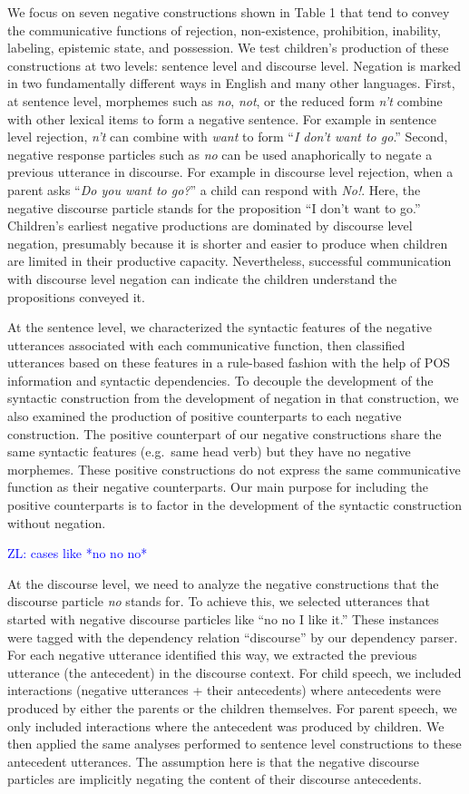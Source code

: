 \documentclass[
  english,
  man,floatsintext]{apa6}
\begin{document}
We focus on seven negative constructions shown in Table 1 that tend to convey the communicative functions of rejection, non-existence, prohibition, inability, labeling, epistemic state, and possession. We test children's production of these constructions at two levels: sentence level and discourse level. Negation is marked in two fundamentally different ways in English and many other languages. First, at sentence level, morphemes such as \emph{no}, \emph{not}, or the reduced form \emph{n't} combine with other lexical items to form a negative sentence. For example in sentence level rejection, \emph{n't} can combine with \emph{want} to form ``\emph{I don't want to go}.'' Second, negative response particles such as \emph{no} can be used anaphorically to negate a previous utterance in discourse. For example in discourse level rejection, when a parent asks ``\emph{Do you want to go?}'' a child can respond with \emph{No!}. Here, the negative discourse particle stands for the proposition ``I don't want to go.'' Children's earliest negative productions are dominated by discourse level negation, presumably because it is shorter and easier to produce when children are limited in their productive capacity. Nevertheless, successful communication with discourse level negation can indicate the children understand the propositions conveyed it.

At the sentence level, we characterized the syntactic features of the negative utterances associated with each communicative function, then classified utterances based on these features in a rule-based fashion with the help of POS information and syntactic dependencies. To decouple the development of the syntactic construction from the development of negation in that construction, we also examined the production of positive counterparts to each negative construction. The positive counterpart of our negative constructions share the same syntactic features (e.g.~same head verb) but they have no negative morphemes. These positive constructions do not express the same communicative function as their negative counterparts. Our main purpose for including the positive counterparts is to factor in the development of the syntactic construction without negation.

\textcolor{blue}{ZL: cases like *no no no*}

At the discourse level, we need to analyze the negative constructions that the discourse particle \emph{no} stands for. To achieve this, we selected utterances that started with negative discourse particles like ``no no I like it.'' These instances were tagged with the dependency relation ``discourse'' by our dependency parser. For each negative utterance identified this way, we extracted the previous utterance (the antecedent) in the discourse context. For child speech, we included interactions (negative utterances + their antecedents) where antecedents were produced by either the parents or the children themselves. For parent speech, we only included interactions where the antecedent was produced by children. We then applied the same analyses performed to sentence level constructions to these antecedent utterances. The assumption here is that the negative discourse particles are implicitly negating the content of their discourse antecedents.
\end{document}
